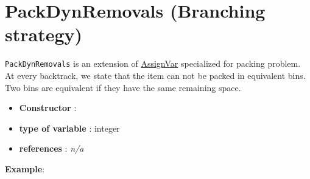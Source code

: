 \section{PackDynRemovals (Branching strategy)}\label{packdynremovals:packdynremovalsbranchstrat}\hypertarget{packdynremovals:packdynremovalsbranchstrat}{}
\begin{notedef}
  \texttt{PackDynRemovals} is an extension of \hyperlink{assignvar:assignvarbranchstrat}{AssignVar} specialized for packing problem. At every backtrack, we state that the item can not be packed in equivalent bins. Two bins are equivalent if they have the same remaining space.
\end{notedef}

\begin{itemize}
	\item \textbf{Constructor} :
	\item \textbf{type of variable} : integer
	\item \textbf{references} : \emph{n/a}
\end{itemize}

\textbf{Example}:
%


